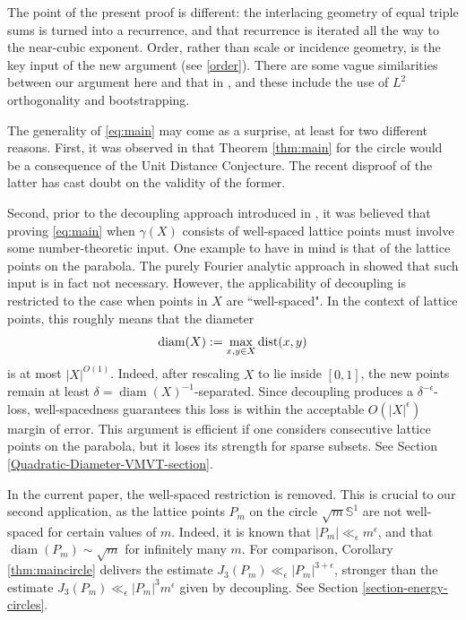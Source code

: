 \documentclass{amsart}
\numberwithin{equation}{section}
\newcommand{\e}{\epsilon}
\newcommand{\ZS}{\mathbb{S}}
\newcommand{\dist}{{\rm{dist}}}
\begin{document}
The point of the present proof is different: the interlacing geometry of equal triple sums is turned into a recurrence, and that recurrence is iterated all the way to the near-cubic exponent. 
Order, rather than scale or incidence geometry, is the key input of the new argument (see \eqref{order}). 
There are some vague similarities between our argument here and that in \cite{Bourgain-Demeter}, and these include the use of $L^2$ orthogonality and bootstrapping.  

\medskip 

The generality of \eqref{eq:main} may come as a surprise, at least for two different reasons.  
First, it was observed in \cite{Bourgain-Demeter} that Theorem \ref{thm:main} for the circle would be a consequence of the Unit Distance Conjecture. 
The recent disproof of the latter has cast doubt on the validity of the former. 


Second, prior to the decoupling approach introduced in \cite{Bourgain-Demeter}, it was believed that proving \eqref{eq:main} when $\gamma(X)$ consists of well-spaced lattice points must involve some number-theoretic input. 
One example to have in mind is that of the lattice points on the parabola. 
The purely Fourier analytic approach in \cite{Bourgain-Demeter} showed that such input is in fact not necessary. 
However, the applicability of decoupling is restricted to the case when points in $X$ are ``well-spaced". 
In the context of lattice points, this roughly means that the diameter 
\[ 
    \operatorname{diam}(X):=\max_{x,y\in X}\dist(x,y)
\]
is at most $|X|^{O(1)}$. 
Indeed, after rescaling $X$ to lie inside $[0,1]$, the new points remain at least $\delta=\operatorname{diam}(X)^{-1}$-separated. 
Since decoupling produces a $\delta^{-\e}$-loss, well-spacedness guarantees this loss is within the acceptable $O(|X|^\e)$ margin of error. This argument is efficient if one considers consecutive lattice points on the parabola, but it loses its strength for sparse subsets. 
See Section \ref{Quadratic-Diameter-VMVT-section}.


In the current paper, the well-spaced restriction is removed.
This is crucial to our second application, as the lattice points $P_m$ on the circle  $\sqrt{m}\ZS^1$ are not well-spaced for certain values of $m$. Indeed, it is known that $|P_m|\ll_\e m^\e$, and that $\operatorname{diam}(P_m)\sim \sqrt{m}$ for infinitely many $m$. For comparison, 
Corollary \ref{thm:maincircle} delivers the estimate $J_3(P_m)\ll_\e |P_m|^{3+\e}$, stronger than the estimate $J_3(P_m)\ll_\e |P_m|^{3}m^{\e}$ given by decoupling. 
See Section \ref{section-energy-circles}.
\end{document}

